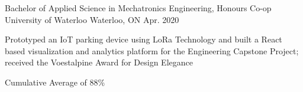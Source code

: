 
\begin{cventries}
  \cventry
    {Bachelor of Applied Science in Mechatronics Engineering, Honours Co-op} %
    {University of Waterloo} %
    {Waterloo, ON} %
    {Apr. 2020} %
    {
      \begin{cvitems} %
          \vspace{1.0mm}
          \item {Prototyped an IoT parking device using LoRa Technology and built a React based visualization and analytics platform for the Engineering Capstone Project; received the Voestalpine Award for Design Elegance}
          \vspace{1.0mm}
          \item {Cumulative Average of 88\%}
      \end{cvitems}
    }
\end{cventries}
